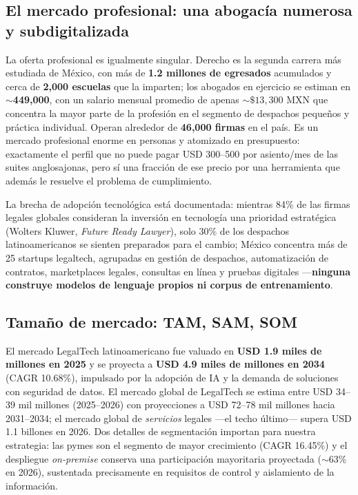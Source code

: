 \subsection{El mercado profesional: una abogacía numerosa y subdigitalizada}

La oferta profesional es igualmente singular. Derecho es la segunda carrera más estudiada de México, con más de \textbf{1.2 millones de egresados} acumulados y cerca de \textbf{2,000 escuelas} que la imparten;\cite{forojuridico2023} los abogados en ejercicio se estiman en $\sim$\textbf{449,000},\cite{mirada360} con un salario mensual promedio de apenas $\sim\$13,300$ MXN que concentra la mayor parte de la profesión en el segmento de despachos pequeños y práctica individual.\cite{forojuridico2023,datamexico} Operan alrededor de \textbf{46,000 firmas} en el país.\cite{industryresearch2026} Es un mercado profesional enorme en personas y atomizado en presupuesto: exactamente el perfil que no puede pagar USD 300--500 por asiento/mes de las suites anglosajonas,\cite{vaquill2026} pero sí una fracción de ese precio por una herramienta que además le resuelve el problema de cumplimiento.

La brecha de adopción tecnológica está documentada: mientras 84\% de las firmas legales globales consideran la inversión en tecnología una prioridad estratégica (Wolters Kluwer, \emph{Future Ready Lawyer}), solo 30\% de los despachos latinoamericanos se sienten preparados para el cambio; México concentra más de 25 startups legaltech, agrupadas en gestión de despachos, automatización de contratos, marketplaces legales, consultas en línea y pruebas digitales ---\textbf{ninguna construye modelos de lenguaje propios ni corpus de entrenamiento}.\cite{computerweekly2025}

\subsection{Tamaño de mercado: TAM, SAM, SOM}

El mercado LegalTech latinoamericano fue valuado en \textbf{USD 1.9 miles de millones en 2025} y se proyecta a \textbf{USD 4.9 miles de millones en 2034} (CAGR 10.68\%), impulsado por la adopción de IA y la demanda de soluciones con seguridad de datos.\cite{imarc2025} El mercado global de LegalTech se estima entre USD 34--39 mil millones (2025--2026) con proyecciones a USD 72--78 mil millones hacia 2031--2034;\cite{mordor2026,fortune2026} el mercado global de \emph{servicios} legales ---el techo último--- supera USD 1.1 billones en 2026.\cite{mordorlegalservices2026} Dos detalles de segmentación importan para nuestra estrategia: las pymes son el segmento de mayor crecimiento (CAGR 16.45\%)\cite{mordor2026} y el despliegue \emph{on-premise} conserva una participación mayoritaria proyectada ($\sim$63\% en 2026), sustentada precisamente en requisitos de control y aislamiento de la información.\cite{fortune2026}

